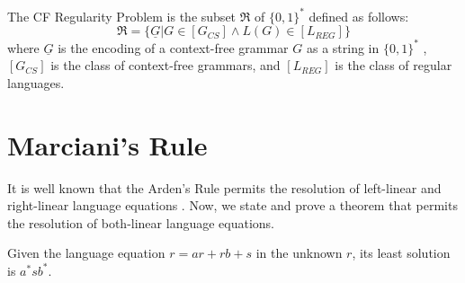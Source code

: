 \documentclass[prodmode,acmtecs]{acmsmall}
\begin{document}
\begin{definition}
	The CF Regularity Problem is the
	subset $\Re$ of $\{0,1\}^{*}$ defined as follows:
	\begin{equation}
	\Re=\{\underline{G}|G\in[G_{CS}]\wedge L(G)\in[L_{REG}]\}
	\end{equation}
	where $\underline{G}$ is the encoding of a context-free grammar $G$
	as a string in $\{0,1\}^{*}$ \cite{Pettorossi13}, $[G_{CS}]$ is the class
	of context-free grammars, and $[L_{REG}]$ is the class of regular
	languages.
\end{definition}

\section{Marciani's Rule}
It is well known that the Arden's Rule permits the resolution of left-linear
and right-linear language equations \cite{Pettorossi13}.
Now, we state and prove a theorem that permits the resolution of both-linear
language equations.

\begin{theorem}
	Given the language equation $r=ar+rb+s$
	in the unknown $r$, its least solution is $a^{*}sb^{*}$.
\end{theorem}
\end{document}
